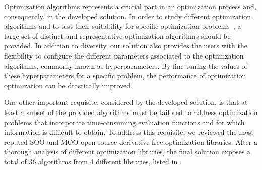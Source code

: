 Optimization algorithms represents a crucial part in an optimization process and, consequently, in the developed solution. In order to study different optimization algorithms and to test their suitability for specific optimization problems~\cite{Wolpert1997NFLT}, a large set of distinct and representative optimization algorithms should be provided. In addition to diversity, our solution also provides the users with the flexibility to configure the different parameters associated to the optimization algorithms, commonly known as hyperparameters. By fine-tuning the values of these hyperparameters for a specific problem, the performance of optimization optimization can be drastically improved. 

One other important requisite, considered by the developed solution, is that at least a subset of the provided algorithms must be tailored to address optimization problems that incorporate time-consuming evaluation functions and for which information is difficult to obtain. To address this requisite, we reviewed the most reputed \ac{SOO} and \ac{MOO} open-source derivative-free optimization libraries. After a thorough analysis of different optimization libraries, the final solution exposes a total of 36 algorithms from 4 different libraries, listed in . 



